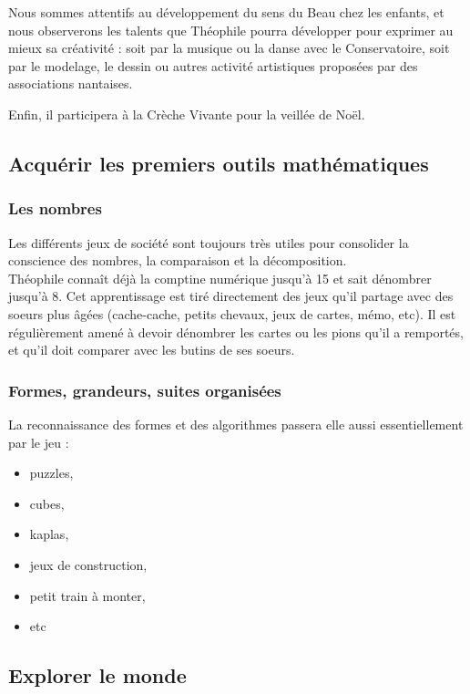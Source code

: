 \documentclass[french]{article}
\begin{document}
	Nous sommes attentifs au développement du sens du Beau chez les enfants, et nous observerons les talents que Théophile pourra développer pour exprimer au mieux sa créativité : soit par la musique ou la danse avec le Conservatoire, soit par le modelage, le dessin ou autres activité artistiques proposées par des associations nantaises. 
	
	Enfin, il participera à la Crèche Vivante pour la veillée de Noël.\\


	
	
	\subsection{Acquérir les premiers outils mathématiques}
	
	\subsubsection{Les nombres}
	Les différents jeux de société sont toujours très utiles pour consolider la conscience des nombres, la comparaison et la décomposition.\\
	
	Théophile connaît déjà la comptine numérique jusqu'à 15 et sait dénombrer jusqu'à 8. Cet apprentissage est tiré directement des jeux qu'il partage avec des soeurs plus âgées (cache-cache, petits chevaux, jeux de cartes, mémo, etc). Il est régulièrement amené à devoir dénombrer les cartes ou les pions qu'il a remportés, et qu'il doit comparer avec les \og{}butins\fg{} de ses soeurs.\\
	
	
		\subsubsection{Formes, grandeurs, suites organisées}
La reconnaissance des formes et des algorithmes passera elle aussi essentiellement par le jeu :
 \begin{itemize}
 	\item puzzles,
 	\item cubes,
 	\item kaplas,
 	\item jeux de construction,
 	\item petit train à monter,
	\item etc
 \end{itemize}
 
 \subsection{Explorer le monde}
 
\end{document}
